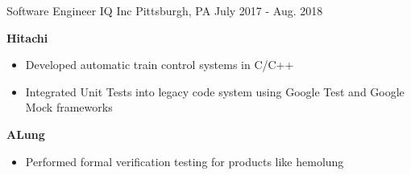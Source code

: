 \begin{cventries}

\cventry
{Software Engineer} %
{IQ Inc} %
{Pittsburgh, PA } %
{July 2017 - Aug. 2018} %
{ %
\begin{cvitems}
\item 
{
    \textbf{Hitachi}
    \begin{itemize}
        \item Developed automatic train control systems in C/C++
        \item Integrated Unit Tests into legacy code system using Google Test and Google Mock frameworks
    \end{itemize} 
}
\item 
{
    \textbf{ALung}
    \begin{itemize}
        \item Performed formal verification testing for products like hemolung
    \end{itemize} 
}  
\end{cvitems}
}




\end{cventries}